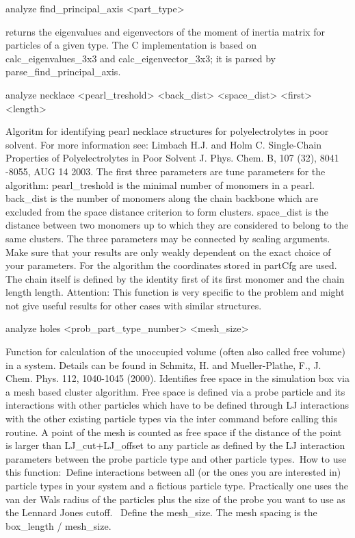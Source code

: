 {\begin{tclcode}
 analyze find_principal_axis { <part_type> } 
\end{tclcode}
returns the eigenvalues and eigenvectors of the moment of inertia matrix for particles of a given type. The C implementation is based on calc\_eigenvalues\_3x3 and calc\_eigenvector\_3x3; it is parsed by parse\_find\_principal\_axis.
\begin{tclcode}
 analyze necklace <pearl_treshold> <back_dist> <space_dist>
<first> <length> 
\end{tclcode}
Algoritm for identifying pearl necklace structures for polyelectrolytes in poor solvent. For more information see: Limbach H.J. and Holm C. Single-Chain Properties of Polyelectrolytes in Poor Solvent J. Phys. Chem. B, 107 (32), 8041 -8055, AUG 14 2003. The first three parameters are tune parameters for the algorithm: pearl\_treshold is the minimal number of monomers in a pearl. back\_dist is the number of monomers along the chain backbone which are excluded from the space distance criterion to form clusters. space\_dist is the distance between two monomers up to which they are considered to belong to the same clusters. The three parameters may be connected by scaling arguments. Make sure that your results are only weakly dependent on the exact choice of your parameters. For the algorithm the coordinates stored in partCfg are used. The chain itself is defined by the identity first of its first monomer and the chain length length. Attention: This function is very specific to the problem and might not give useful results for other cases with similar structures.
\begin{tclcode}
 analyze holes <prob_part_type_number> <mesh_size> 
\end{tclcode}
Function for calculation of the unoccupied volume (often also called free volume) in a system. Details can be found in Schmitz, H. and Mueller-Plathe, F., J. Chem. Phys. 112, 1040-1045 (2000). Identifies free space in the simulation box via a mesh based cluster algorithm. Free space is defined via a probe particle and its interactions with other particles which have to be defined through LJ interactions with the other existing particle types via the inter command before calling this routine. A point of the mesh is counted as free space if the distance of the point is larger than LJ\_cut+LJ\_offset to any particle as defined by the LJ interaction parameters between the probe particle type and other particle types.\
How to use this function:\ Define interactions between all (or the ones you are interested in) particle types in your system and a fictious particle type. Practically one uses the van der Wals radius of the particles plus the size of the probe you want to use as the Lennard Jones cutoff. \ Define the mesh\_size. The mesh spacing is the box\_length / mesh\_size.\

}
